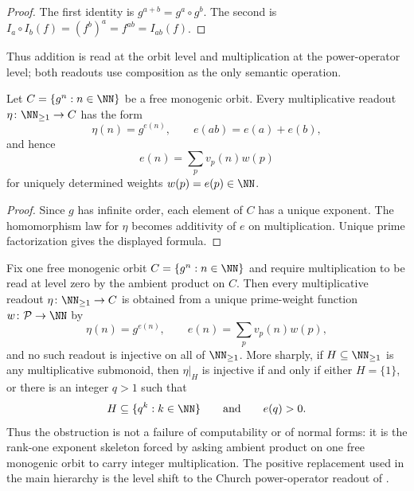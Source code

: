 \begin{proof}
The first identity is \(g^{a+b}=g^a\circ g^b\).  The second is
\(I_a\circ I_b(f)=(f^b)^a=f^{ab}=I_{ab}(f)\).
\end{proof}

Thus addition is read at the orbit level and multiplication at the power-operator
level; both readouts use composition as the only semantic operation.
\begin{lemma}
\label{lem:level-zero-exponent-skeleton}
Let \(C=\{g^n:n\in\NN\}\) be a free monogenic orbit.  Every multiplicative
readout \(\eta\colon\NN_{\ge1}\to C\) has the form
\[
  \eta(n)=g^{e(n)},
  \qquad e(ab)=e(a)+e(b),
\]
and hence
\[
  e(n)=\sum_{p}v_p(n)w(p)
\]
for uniquely determined weights \(w(p)=e(p)\in\NN\).
\end{lemma}

\begin{proof}
Since \(g
\) has infinite order, each element of \(C\) has a unique exponent.  The
homomorphism law for \(\eta\) becomes additivity of \(e\) on multiplication.
Unique prime factorization gives the displayed formula.
\end{proof}

\begin{theorem}
\label{thm:level-zero-obstruction}
Fix one free monogenic orbit \(C=\{g^n:n\in\NN\}\) and require multiplication to
be read at level zero by the ambient product on \(C\).  Then every
multiplicative readout \(\eta\colon\NN_{\ge1}\to C\) is obtained from a unique
prime-weight function \(w\colon\mathcal P\to\NN\) by
\[
  \eta(n)=g^{e(n)},
  \qquad e(n)=\sum_p v_p(n)w(p),
\]
and no such readout is injective on all of \(\NN_{\ge1}\).  More sharply, if
\(H\subseteq\NN_{\ge1}\) is any multiplicative submonoid, then
\(\eta|_H\) is injective if and only if either \(H=\{1\}\), or there is an
integer \(q>1\) such that
\[
  H\subseteq\{q^k:k\in\NN\}
  \qquad\hbox{and}\qquad e(q)>0.
\]
Thus the obstruction is not a failure of computability or of normal forms: it is
the rank-one exponent skeleton forced by asking ambient product on one free
monogenic orbit to carry integer multiplication.  The positive replacement used
in the main hierarchy is the level shift to the Church power-operator readout of
.
\end{theorem}

